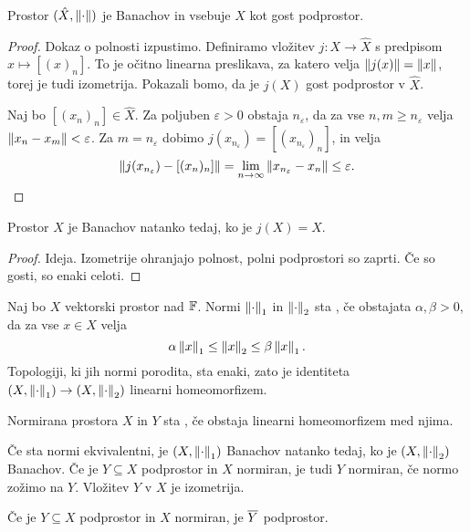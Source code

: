 \begin{izrek}
  Prostor $(\hat{X}, \left\lVert\cdot\right\rVert)$ je Banachov in vsebuje $X$ kot gost
  podprostor.
\end{izrek}

\begin{proof}
  Dokaz o polnosti izpustimo.
  Definiramo vložitev $j: X \to \hat{X}$ s predpisom $x \mapsto [(x)_n]$.
  To je očitno linearna preslikava, za katero velja $\left\lVert j(x)\right\rVert = \left\lVert x\right\rVert$,
  torej je tudi izometrija.
  Pokazali bomo, da je $j(X)$ gost podprostor v $\hat{X}$.

  Naj bo $[(x_n)_n] \in \hat{X}$.
  Za poljuben $\varepsilon > 0$ obstaja $n_\varepsilon$, da za vse $n, m \ge
  n_\varepsilon$ velja $\left\lVert x_n - x_m\right\rVert < \varepsilon$.
  Za $m = n_\varepsilon$ dobimo $j(x_{n_\varepsilon}) =
  [(x_{n_\varepsilon})_n]$, in velja
  \[
	\left\lVert j(x_{n_\varepsilon}) - [(x_n)_n]\right\rVert = \lim_{n \to \infty}
	\left\lVert x_{n_\varepsilon} - x_n\right\rVert \le \varepsilon.
	\qedhere
  \]
\end{proof}

\begin{posledica}
  Prostor $X$ je Banachov natanko tedaj, ko je $j(X) = \hat{X}$.
\end{posledica}

\begin{proof}
  Ideja.
  Izometrije ohranjajo polnost, polni podprostori so zaprti.
  Če so gosti, so enaki celoti.
\end{proof}


Naj bo $X$ vektorski prostor nad $\mathbb{F}$.
Normi $\left\lVert\cdot\right\rVert_1$ in $\left\lVert\cdot\right\rVert_2$ sta , če
obstajata $\alpha, \beta > 0$, da za vse $x \in X$ velja
\[
  \alpha \left\lVert x\right\rVert_1 \le \left\lVert x\right\rVert_2 \le \beta \left\lVert x\right\rVert_1.
\]
Topologiji, ki jih normi porodita, sta enaki, zato je identiteta $(X,
\left\lVert\cdot\right\rVert_1) \to (X, \left\lVert\cdot\right\rVert_2)$ linearni homeomorfizem.

\begin{definicija}
  Normirana prostora $X$ in $Y$ sta , če obstaja linearni
  homeomorfizem med njima.
\end{definicija}

Če sta normi ekvivalentni, je $(X, \left\lVert\cdot\right\rVert_1)$ Banachov natanko tedaj, ko
je $(X, \left\lVert\cdot\right\rVert_2)$ Banachov.
Če je $Y \subseteq X$ podprostor in $X$ normiran, je tudi $Y$ normiran, če normo
zožimo na $Y$.
Vložitev $Y$ v $X$ je izometrija.

\begin{lema}
  Če je $Y \subseteq X$ podprostor in $X$ normiran, je $\overline{Y}$ podprostor.
\end{lema}

